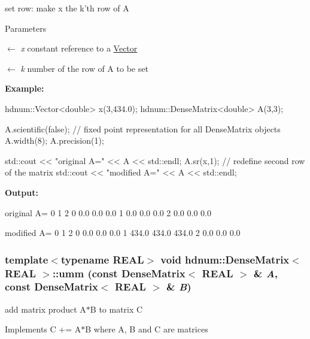 set row: make x the k'th row of A 


\begin{DoxyParams}{Parameters}
\item[\mbox{$\leftarrow$} {\em x}]constant reference to a \hyperlink{classhdnum_1_1Vector}{Vector} \item[\mbox{$\leftarrow$} {\em k}]number of the row of A to be set\end{DoxyParams}
{\bfseries Example:} 
\begin{DoxyCode}
  hdnum::Vector<double> x(3,434.0);
  hdnum::DenseMatrix<double> A(3,3);

  A.scientific(false); // fixed point representation for all DenseMatrix objects
  A.width(8);
  A.precision(1);
  
  std::cout << "original A=" << A << std::endl;
  A.sr(x,1);   // redefine second row of the matrix
  std::cout << "modified A=" << A << std::endl;
\end{DoxyCode}


{\bfseries Output:} \begin{DoxyVerb}
original A=
                    0        1        2 
          0       0.0      0.0      0.0 
          1       0.0      0.0      0.0 
          2       0.0      0.0      0.0 

modified A=
                    0        1        2 
          0       0.0      0.0      0.0 
          1     434.0    434.0    434.0 
          2       0.0      0.0      0.0 
	  \end{DoxyVerb}
 \hypertarget{classhdnum_1_1DenseMatrix_a45630f26522adf719f3947d09145b7c2}{
\subsubsection[{umm}]{\setlength{\rightskip}{0pt plus 5cm}template$<$typename REAL$>$ void {\bf hdnum::DenseMatrix}$<$ REAL $>$::umm (const {\bf DenseMatrix}$<$ REAL $>$ \& {\em A}, \/  const {\bf DenseMatrix}$<$ REAL $>$ \& {\em B})}}
\label{classhdnum_1_1DenseMatrix_a45630f26522adf719f3947d09145b7c2}


add matrix product A$\ast$B to matrix C 

Implements C += A$\ast$B where A, B and C are matrices


